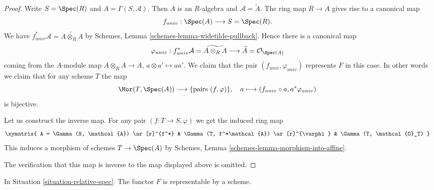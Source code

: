 \begin{proof}
Write $S = \Spec(R)$ and $A = \Gamma(S, \mathcal{A})$.
Then $A$ is an $R$-algebra and $\mathcal{A} = \widetilde A$.
The ring map $R \to A$ gives rise to a canonical map
$$
f_{univ} : \Spec(A)
\longrightarrow
S = \Spec(R).
$$
We have
$f_{univ}^*\mathcal{A} =  \widetilde{A \otimes_R A}$
by Schemes, Lemma \ref{schemes-lemma-widetilde-pullback}.
Hence there is a canonical map
$$
\varphi_{univ} :
f_{univ}^*\mathcal{A} = \widetilde{A \otimes_R A}
\longrightarrow
\widetilde A = \mathcal{O}_{\Spec(A)}
$$
coming from the $A$-module map $A \otimes_R A \to A$,
$a \otimes a' \mapsto aa'$. We claim that the pair
$(f_{univ}, \varphi_{univ})$ represents $F$ in this case.
In other words we claim that for any scheme $T$ the map
$$
\Mor(T, \Spec(A)) \longrightarrow \{\text{pairs } (f, \varphi)\},\quad
a \longmapsto (f_{univ} \circ a, a^*\varphi_{univ})
$$
is bijective.

\medskip\noindent
Let us construct the inverse map.
For any pair $(f : T \to S, \varphi)$ we get the induced
ring map
$$
\xymatrix{
A = \Gamma(S, \mathcal{A}) \ar[r]^{f^*} &
\Gamma(T, f^*\mathcal{A}) \ar[r]^{\varphi} &
\Gamma(T, \mathcal{O}_T)
}
$$
This induces a morphism of schemes $T \to \Spec(A)$
by Schemes, Lemma \ref{schemes-lemma-morphism-into-affine}.

\medskip\noindent
The verification that this map is inverse to the map
displayed above is omitted.
\end{proof}

\begin{lemma}
\label{lemma-spec}
In Situation \ref{situation-relative-spec}.
The functor $F$ is representable by a scheme.
\end{lemma}

